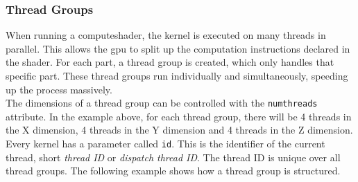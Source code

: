 \subsubsection{Thread Groups}
When running a \gls{computeshader}, the \gls{kernel} is executed on many threads in parallel.
This allows the \gls{gpu} to split up the computation instructions declared in the \gls{shader}.
For each part, a thread group is created, which only handles that specific part.
These thread groups run individually and simultaneously, speeding up the process massively.
\\
The dimensions of a thread group can be controlled with the \lstinline[language=HLSL]{numthreads} attribute.
In the example above, for each thread group, there will be 4 threads in the X dimension, 4 threads in the Y dimension and 4 threads in the Z dimension.
\emptyline
Every \gls{kernel} has a parameter called \lstinline[language=HLSL]{id}. This is the identifier of the current thread, short \emph{thread ID} or \emph{dispatch thread ID}.
The thread ID is unique over all thread groups. The following example shows how a thread group is structured.

